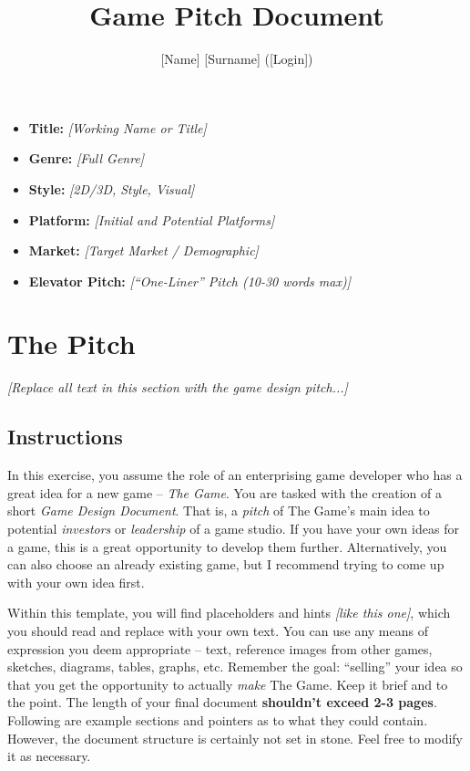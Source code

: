 \documentclass[a4paper,10pt,english]{article}
\title{%
Game Pitch Document%
}
\author{%
[Name] [Surname] ([Login])%
}
\date{}
\newcommand{\ph}[1]{\textit{[#1]}}
\begin{document}
\maketitle
\thispagestyle{empty}

{%
\large

\begin{itemize}

\item[] \textbf{Title:} \ph{Working Name or Title}

\item[] \textbf{Genre:} \ph{Full Genre}

\item[] \textbf{Style:} \ph{2D/3D, Style, Visual}

\item[] \textbf{Platform:} \ph{Initial and Potential Platforms}

\item[] \textbf{Market:} \ph{Target Market / Demographic}

\item[] \textbf{Elevator Pitch:} \ph{``One-Liner'' Pitch (10-30 words max)}

\end{itemize}

}

\section*{\centering The Pitch}

\ph{Replace all text in this section with the game design pitch...}

\subsection*{Instructions}

In this exercise, you assume the role of an enterprising game developer who has a great idea for a new game -- \emph{The Game}. You are tasked with the creation of a short \emph{Game Design Document}. That is, a \emph{pitch} of The Game's main idea to potential \emph{investors} or \emph{leadership} of a game studio. If you have your own ideas for a game, this is a great opportunity to develop them further. Alternatively, you can also choose an already existing game, but I recommend trying to come up with your own idea first. 

Within this template, you will find placeholders and hints \ph{like this one}, which you should read and replace with your own text. You can use any means of expression you deem appropriate -- text, reference images from other games, sketches, diagrams, tables, graphs, etc. Remember the goal: ``selling'' your idea so that you get the opportunity to actually \emph{make} The Game. Keep it brief and to the point. The length of your final document \textbf{shouldn't exceed 2-3 pages}. Following are example sections and pointers as to what they could contain. However, the document structure is certainly not set in stone. Feel free to modify it as necessary.
\end{document}

